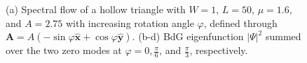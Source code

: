 \documentclass[aps,prb,twocolumn,showpacs,amsmath,amssymb,superscriptaddress]{revtex4-2}
\let\oldhat\hat
\renewcommand{\hat}[1]{\oldhat{\mathbf{#1}}}
\begin{document}
\begin{figure}[ht]
  \hspace{-20pt}
  \hspace{-20pt}
  \caption{(a) Spectral flow of a hollow triangle with $W=1$, $L=50$, $\mu=1.6$, and $A=2.75$ with increasing rotation angle $\varphi$, defined through $\mathbf A = A(-\sin\varphi \hat{x} + \cos\varphi \hat{y})$. (b-d) BdG eigenfunction $|\Psi|^2$ summed over the two zero modes at $\varphi = 0, \frac{\pi}{6}$, and $\frac{\pi}{3}$, respectively.}
  \label{fig: rotation}
\end{figure}
\end{document}
